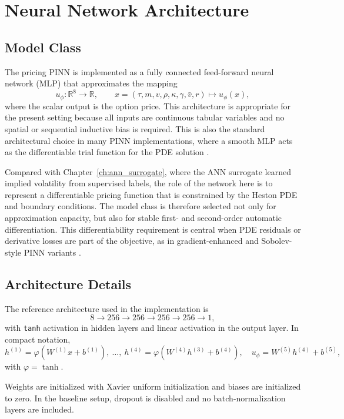 \section{Neural Network Architecture}

\subsection{Model Class}

The pricing PINN is implemented as a fully connected feed-forward neural network (MLP) that approximates the mapping
\[
u_\phi:\mathbb{R}^8\to\mathbb{R},
\qquad
x=(\tau,m,v,\rho,\kappa,\gamma,\bar v,r)\mapsto u_\phi(x),
\]
where the scalar output is the option price. This architecture is appropriate for the present setting because all inputs are continuous tabular variables and no spatial or sequential inductive bias is required.
This is also the standard architectural choice in many PINN implementations, where a smooth MLP acts as the differentiable trial function for the PDE solution \cite{hainaut2024pinn,urban_2025}.

Compared with Chapter~\ref{ch:ann_surrogate}, where the ANN surrogate learned implied volatility from supervised labels, the role of the network here is to represent a differentiable pricing function that is constrained by the Heston PDE and boundary conditions. The model class is therefore selected not only for approximation capacity, but also for stable first- and second-order automatic differentiation.
This differentiability requirement is central when PDE residuals or derivative losses are part of the objective, as in gradient-enhanced and Sobolev-style PINN variants \cite{yu2022gpinn,czarnecki2017sobolev}.

\subsection{Architecture Details}

The reference architecture used in the implementation is
\[
8 \rightarrow 256 \rightarrow 256 \rightarrow 256 \rightarrow 256 \rightarrow 1,
\]
with \texttt{tanh} activation in hidden layers and linear activation in the output layer. In compact notation,
\[
h^{(1)}=\varphi(W^{(1)}x+b^{(1)}),\ \dots,\
h^{(4)}=\varphi(W^{(4)}h^{(3)}+b^{(4)}),\quad
u_\phi=W^{(5)}h^{(4)}+b^{(5)},
\]
with $\varphi=\tanh$.

Weights are initialized with Xavier uniform initialization and biases are initialized to zero. In the baseline setup, dropout is disabled and no batch-normalization layers are included.

